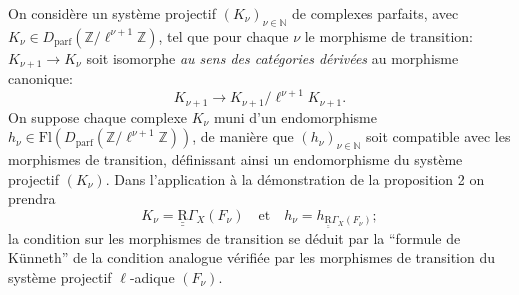 \documentclass[11pt]{article}
\begin{document}
On considère un système projectif $(K_\nu)_{\nu\in\mathbb N}$ de complexes parfaits, avec $K_\nu\in D_{\mathrm{parf}}(\mathbb Z/\ell^{\nu+1}\mathbb Z)$, tel que pour chaque $\nu$ le
morphisme de transition: $K_{\nu+1}\to K_\nu$ soit isomorphe \emph{au sens des catégories dérivées} au morphisme canonique:
\[
K_{\nu+1}\to K_{\nu+1}/\ell^{\nu+1}K_{\nu+1}.
\]
On suppose chaque complexe $K_\nu$ muni d'un endomorphisme $h_\nu\in\mathrm{Fl}(D_{\mathrm{parf}}(\mathbb Z/\ell^{\nu+1}\mathbb Z))$, de manière que $(h_\nu)_{\nu\in\mathbb N}$ soit compatible avec les morphismes de transition, définissant ainsi un endomorphisme du système projectif $(K_\nu)$. Dans l'application à la démonstration de la proposition 2 on prendra
\[
K_\nu=\underline{\underline{\mathrm{R}}}\Gamma_X(F_\nu)\quad\text{et}\quad h_\nu=h_{\underline{\underline{\mathrm{R}}}\Gamma_X(F_\nu)};
\]
la condition sur les morphismes de transition se déduit par la ``formule de Künneth'' de la condition analogue vérifiée par les morphismes de transition du système projectif $\ell$-adique $(F_\nu)$.
\end{document}
